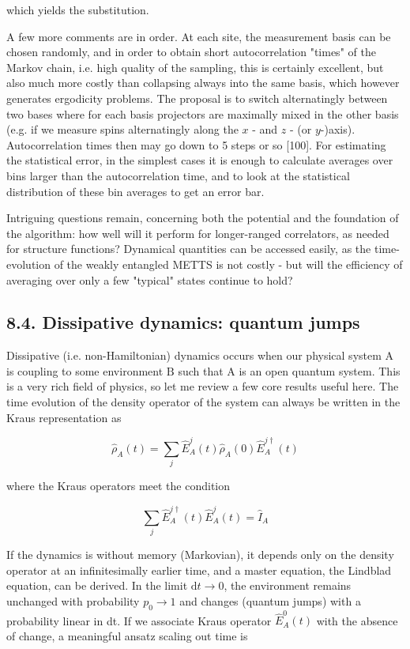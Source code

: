 \documentclass[12pt]{article}
\begin{document}
which yields the substitution.

A few more comments are in order. At each site, the measurement basis can be chosen randomly, and in order to obtain short autocorrelation "times" of the Markov chain, i.e. high quality of the sampling, this is certainly excellent, but also much more costly than collapsing always into the same basis, which however generates ergodicity problems. The proposal is to switch alternatingly between two bases where for each basis projectors are maximally mixed in the other basis (e.g. if we measure spins alternatingly along the $x$ - and $z$ - (or $y$-)axis). Autocorrelation times then may go down to 5 steps or so [100]. For estimating the statistical error, in the simplest cases it is enough to calculate averages over bins larger than the autocorrelation time, and to look at the statistical distribution of these bin averages to get an error bar.

Intriguing questions remain, concerning both the potential and the foundation of the algorithm: how well will it perform for longer-ranged correlators, as needed for structure functions? Dynamical quantities can be accessed easily, as the time-evolution of the weakly entangled METTS is not costly - but will the efficiency of averaging over only a few "typical" states continue to hold?

\subsection*{8.4. Dissipative dynamics: quantum jumps}
Dissipative (i.e. non-Hamiltonian) dynamics occurs when our physical system A is coupling to some environment $\mathrm{B}$ such that $\mathrm{A}$ is an open quantum system. This is a very rich field of physics, so let me review a few core results useful here. The time evolution of the density operator of the system can always be written in the Kraus representation as


\begin{equation*}
\hat{\rho}_{A}(t)=\sum_{j} \hat{E}_{A}^{j}(t) \hat{\rho}_{A}(0) \hat{E}_{A}^{j \dagger}(t) \tag{310}
\end{equation*}


where the Kraus operators meet the condition


\begin{equation*}
\sum_{j} \hat{E}_{A}^{j \dagger}(t) \hat{E}_{A}^{j}(t)=\hat{I}_{A} \tag{311}
\end{equation*}


If the dynamics is without memory (Markovian), it depends only on the density operator at an infinitesimally earlier time, and a master equation, the Lindblad equation, can be derived. In the limit $\mathrm{d} t \rightarrow 0$, the environment remains unchanged with probability $p_{0} \rightarrow 1$ and changes (quantum jumps) with a probability linear in dt. If we associate Kraus operator $\hat{E}_{A}^{0}(t)$ with the absence of change, a meaningful ansatz scaling out time is
\end{document}
